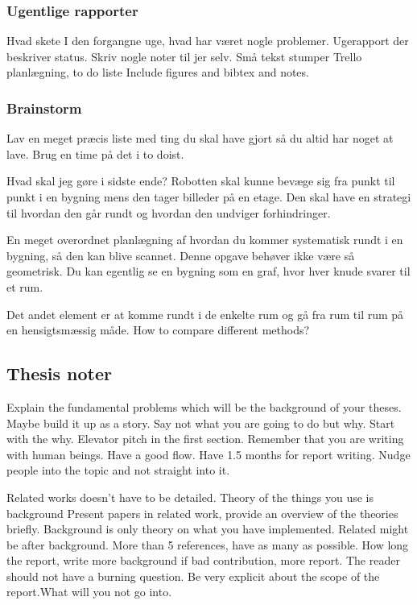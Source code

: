 \subsubsection{Ugentlige rapporter}
Hvad skete I den forgangne uge, hvad har været nogle problemer.
Ugerapport der beskriver status.
Skriv nogle noter til jer selv.
Små tekst stumper
Trello planlægning, to do liste
Include figures and bibtex and notes.


\subsubsection{Brainstorm}
Lav en meget præcis liste med ting du skal have gjort så du altid har noget at lave.
Brug en time på det i to doist.

Hvad skal jeg gøre i sidste ende?
Robotten skal kunne bevæge sig fra punkt til punkt i en bygning mens den tager billeder på en etage. Den skal have en strategi til hvordan den går rundt og hvordan den undviger forhindringer.

En meget overordnet planlægning af hvordan du kommer systematisk rundt i en bygning, så den kan blive scannet.
Denne opgave behøver ikke være så geometrisk. Du kan egentlig se en bygning som en graf, hvor hver knude svarer til et rum.

Det andet element er at komme rundt i de enkelte rum og gå fra rum til rum på en hensigtsmæssig måde.
How to compare different methods?

\subsection{Thesis noter}
Explain the fundamental problems which will be the background of your theses.
Maybe build it up as a story.
Say not what you are going to do but why.
Start with the why. Elevator pitch in the first section.
Remember that you are writing with human beings. Have a good flow. Have 1.5 months for report writing.
Nudge people into the topic and not straight into it.

Related works doesn't have to be detailed.
Theory of the things you use is background
Present papers in related work, provide an overview of the theories briefly.
Background is only theory on what you have implemented.
Related might be after background.
More than 5 references, have as many as possible.
How long the report, write more background if bad contribution, more report.
The reader should not have a burning question.
Be very explicit about the scope of the report.What will you not go into.

